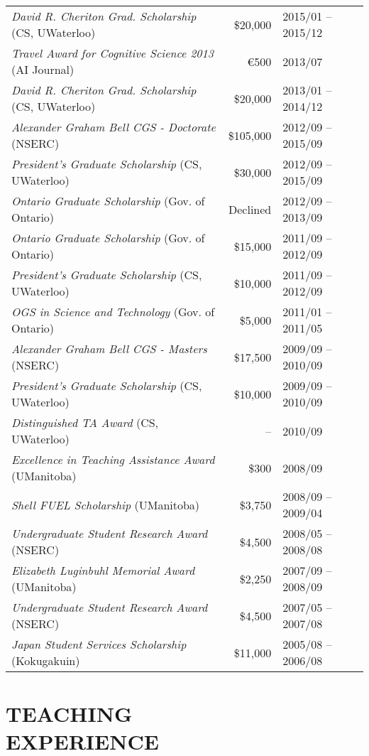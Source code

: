 \documentclass[line,margin]{res}
\begin{document}
\begin{resume}
\begin{tabular}{lrl}
{\sl David R. Cheriton Grad. Scholarship} (CS, UWaterloo) &
\$20,000 & 2015/01 -- 2015/12\\
{\sl Travel Award for Cognitive Science 2013} (AI Journal) &
\euro{}500 & 2013/07 \\
{\sl David R. Cheriton Grad. Scholarship} (CS, UWaterloo) &
\$20,000 & 2013/01 -- 2014/12\\
{\sl Alexander Graham Bell CGS - Doctorate} (NSERC) &
\$105,000 & 2012/09 -- 2015/09 \\
{\sl President's Graduate Scholarship} (CS, UWaterloo) &
\$30,000 & 2012/09 -- 2015/09 \\
{\sl Ontario Graduate Scholarship} (Gov. of Ontario) &
Declined & 2012/09 -- 2013/09 \\
{\sl Ontario Graduate Scholarship} (Gov. of Ontario) &
\$15,000 & 2011/09 -- 2012/09 \\
{\sl President's Graduate Scholarship} (CS, UWaterloo) &
\$10,000 & 2011/09 -- 2012/09 \\
{\sl OGS in Science and Technology} (Gov. of Ontario) &
\$5,000 & 2011/01 -- 2011/05 \\
{\sl Alexander Graham Bell CGS - Masters} (NSERC) &
\$17,500 & 2009/09 -- 2010/09 \\
{\sl President's Graduate Scholarship} (CS, UWaterloo) &
\$10,000 & 2009/09 -- 2010/09 \\
{\sl Distinguished TA Award} (CS, UWaterloo) &
-- & 2010/09 \\
{\sl Excellence in Teaching Assistance Award} (UManitoba) &
\$300 & 2008/09 \\
{\sl Shell FUEL Scholarship} (UManitoba) &
\$3,750 & 2008/09 -- 2009/04 \\
{\sl Undergraduate Student Research Award} (NSERC) &
\$4,500 & 2008/05 -- 2008/08 \\
{\sl Elizabeth Luginbuhl Memorial Award} (UManitoba) &
\$2,250 & 2007/09 -- 2008/09 \\
{\sl Undergraduate Student Research Award} (NSERC) &
\$4,500 & 2007/05 -- 2007/08 \\
{\sl Japan Student Services Scholarship} (Kokugakuin) &
\$11,000 & 2005/08 -- 2006/08
\end{tabular}

\section{TEACHING \\EXPERIENCE}


\end{resume}
\end{document}
